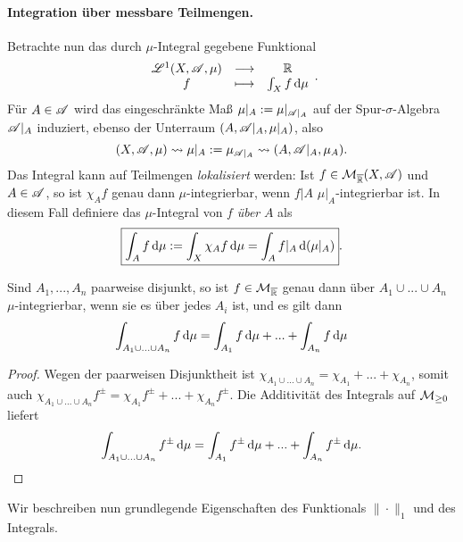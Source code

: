 \paragraph{Integration über messbare Teilmengen.}
Betrachte nun das durch $\mu$-Integral gegebene Funktional
\begin{equation*}
\begin{array}{ccc}
\LL^1(X,\AA,\mu) & \longrightarrow & \R \\
f & \longmapsto & \int_X f \D \mu
\end{array}.
\end{equation*}
Für $A\in \AA$ wird das eingeschränkte Maß $\mu|_A:=\mu|_{\AA|_A}$ auf der Spur-$\sigma$-Algebra $\AA|_A$ induziert, ebenso der Unterraum $(A,\AA|_A,\mu|_A)$, also
$$(X,\AA,\mu) \leadsto \mu|_A:=\mu_{\AA|_A}\leadsto (A,\AA|_A,\mu_A).$$
Das Integral kann auf Teilmengen \emph{lokalisiert} werden: Ist $f\in \MM_{\ol\R}(X,\AA)$ und $A\in\AA$, so ist $\chi_A f$ genau dann $\mu$-integrierbar, wenn $f|A$ $\mu|_A$-integrierbar ist. In diesem Fall definiere das $\mu$-Integral von $f$ \emph{über} $A$ als
$$
\boxed{
\int_A f \D \mu := \int_X \chi_Af\D\mu = \int_Af|_A \D (\mu|_A)
}.$$
\begin{lemma} \label{integral-zerlegung}
\begin{mdframed}
Sind $A_1,...,A_n$ paarweise disjunkt, so ist $f\in \MM_{\ol\R}$ genau dann über $A_1\cup ... \cup A_n$ $\mu$-integrierbar, wenn sie es über jedes $A_i$ ist, und es gilt dann
$$
\int_{A_1\cup...\cup A_n} f \D\mu = \int_{A_1}f\D \mu + ... + \int_{A_n} f \D \mu
$$
\end{mdframed}
\begin{proof}
Wegen der paarweisen Disjunktheit ist $\chi_{A_1\cup...\cup A_n}=\chi_{A_1}+...+\chi_{A_n}$, somit auch $\chi_{A_1\cup...\cup A_n}f^\pm=\chi_{A_1}f^\pm+...+\chi_{A_n}f^\pm$. Die Additivität des Integrals auf $\MM_{\geq 0}$ liefert
$$
\int_{A_1\cup...\cup A_n} f^\pm \D\mu=\int_{A_1}f^\pm \D\mu + ... +\int_{A_n}f^\pm \D \mu.
$$
\end{proof}
\end{lemma}
Wir beschreiben nun grundlegende Eigenschaften des Funktionals $\|\cdot \|_1$ und des Integrals.
